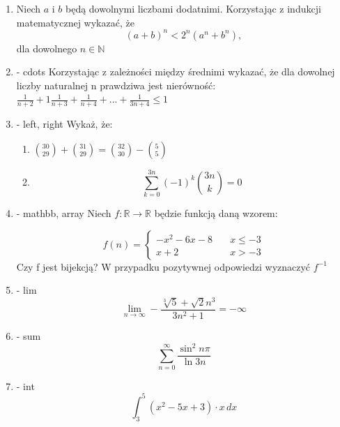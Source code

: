 \documentclass{article}
\begin{document}
\begin{enumerate}[label=\underline{Przykład \arabic{enumi}}, wide=0pt]
	\item 
Niech $a$ i $b$  będą dowolnymi liczbami dodatnimi. Korzystając z indukcji matematycznej wykazać, że
\begin{equation*}
(a+b)^n <2^n(a^n+b^n),
\end{equation*}
dla dowolnego $n \in \mathbb{N} $


\item - cdots
Korzystając z zależności między średnimi wykazać, że dla dowolnej liczby naturalnej n prawdziwa jest nierówność:
$ \frac{1}{n+2} + 1\frac{1}{n+3}  + \frac{1}{n+4}  + ... + \frac{1}{3n+4}  \leq 1 $


\item - left, right
Wykaż, że:
\begin{enumerate}
	\item $\binom{30}{29} + \binom{31}{29} = \binom{32}{30} - \binom{5}{5}$
	\item 
		\begin{equation*}
			\sum_{k=0}^{3n} (-1)^k \binom{3n}{k} = 0
		\end{equation*}
\end{enumerate}


\item - mathbb, array
Niech $f : \mathbb{R} \to \mathbb{R} $ będzie funkcją daną wzorem:

\[ f(n) =
  \begin{cases}
    -x^2-6x-8 & \quad x \leqslant -3 \\
    x+2 & \quad x > -3
  \end{cases}
\]
Czy f jest bijekcją? W przypadku pozytywnej odpowiedzi wyznaczyć $f^{-1}$ 

\item - lim
	\begin{equation*}
		\lim\limits_{n \to \infty} - \frac{\sqrt[3]{5}+\sqrt{2}n^3}{3n^2+1} = -\infty
	\end{equation*}
	
\item - sum
	\begin{equation*}
		\displaystyle\sum_{n=0}^{\infty} \frac{\sin^2{n\pi}}{\ln{3n}}
	\end{equation*}
	
\item - int
	\begin{equation*}
		\int_{3}^{5} (x^2-5x+3)\cdot x \, dx
	\end{equation*}


\end{enumerate}
\end{document}
